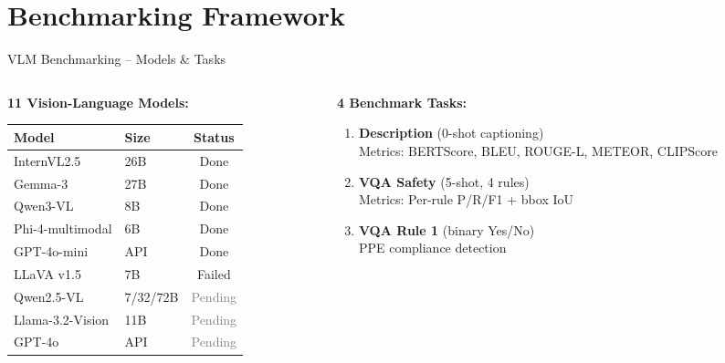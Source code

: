 \documentclass[aspectratio=169, 10pt]{beamer}
\begin{document}
\section{Benchmarking Framework}

\begin{frame}{VLM Benchmarking -- Models \& Tasks}
\begin{columns}[T]
\begin{column}{0.45\textwidth}
\textbf{11 Vision-Language Models:}

\vspace{0.3em}
{\small
\begin{tabular}{llc}
\toprule
\textbf{Model} & \textbf{Size} & \textbf{Status} \\
\midrule
InternVL2.5 & 26B & \textcolor{okgreen}{Done} \\
Gemma-3 & 27B & \textcolor{okgreen}{Done} \\
Qwen3-VL & 8B & \textcolor{okgreen}{Done} \\
Phi-4-multimodal & 6B & \textcolor{okgreen}{Done} \\
GPT-4o-mini & API & \textcolor{okgreen}{Done} \\
LLaVA v1.5 & 7B & \textcolor{warnred}{Failed} \\
\midrule
Qwen2.5-VL & 7/32/72B & \textcolor{gray}{Pending} \\
Llama-3.2-Vision & 11B & \textcolor{gray}{Pending} \\
GPT-4o & API & \textcolor{gray}{Pending} \\
\bottomrule
\end{tabular}
}
\end{column}
\begin{column}{0.52\textwidth}
\textbf{4 Benchmark Tasks:}

\vspace{0.3em}
\begin{enumerate}
    \item \textbf{Description} (0-shot captioning)\\
    {\scriptsize Metrics: BERTScore, BLEU, ROUGE-L, METEOR, CLIPScore}

    \vspace{0.2em}
    \item \textbf{VQA Safety} (5-shot, 4 rules)\\
    {\scriptsize Metrics: Per-rule P/R/F1 + bbox IoU}

    \vspace{0.2em}
    \item \textbf{VQA Rule 1} (binary Yes/No)\\
    {\scriptsize PPE compliance detection}


\end{enumerate}
\end{column}
\end{columns}
\end{frame}
\end{document}
